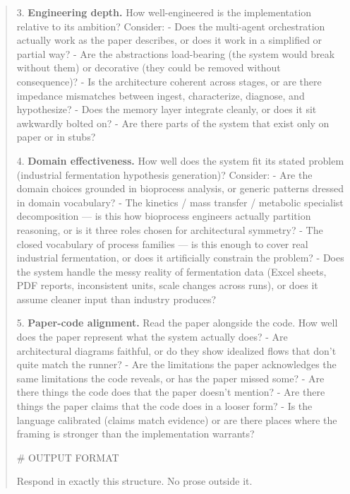\documentclass[11pt]{article}
\begin{document}
\begin{quote}
3. \textbf{Engineering depth.} How well-engineered is the implementation
   relative to its ambition? Consider:
   - Does the multi-agent orchestration actually work as the paper
     describes, or does it work in a simplified or partial way?
   - Are the abstractions load-bearing (the system would break
     without them) or decorative (they could be removed without
     consequence)?
   - Is the architecture coherent across stages, or are there
     impedance mismatches between ingest, characterize, diagnose,
     and hypothesize?
   - Does the memory layer integrate cleanly, or does it sit awkwardly
     bolted on?
   - Are there parts of the system that exist only on paper or in
     stubs?

4. \textbf{Domain effectiveness.} How well does the system fit its stated
   problem (industrial fermentation hypothesis generation)? Consider:
   - Are the domain choices grounded in bioprocess analysis, or
     generic patterns dressed in domain vocabulary?
   - The kinetics / mass transfer / metabolic specialist
     decomposition — is this how bioprocess engineers actually
     partition reasoning, or is it three roles chosen for
     architectural symmetry?
   - The closed vocabulary of process families — is this enough to
     cover real industrial fermentation, or does it artificially
     constrain the problem?
   - Does the system handle the messy reality of fermentation data
     (Excel sheets, PDF reports, inconsistent units, scale changes
     across runs), or does it assume cleaner input than industry
     produces?

5. \textbf{Paper-code alignment.} Read the paper alongside the code. How
   well does the paper represent what the system actually does?
   - Are architectural diagrams faithful, or do they show idealized
     flows that don't quite match the runner?
   - Are the limitations the paper acknowledges the same limitations
     the code reveals, or has the paper missed some?
   - Are there things the code does that the paper doesn't mention?
   - Are there things the paper claims that the code does in a
     looser form?
   - Is the language calibrated (claims match evidence) or are
     there places where the framing is stronger than the
     implementation warrants?

\# OUTPUT FORMAT

Respond in exactly this structure. No prose outside it.


\end{quote}
\end{document}
